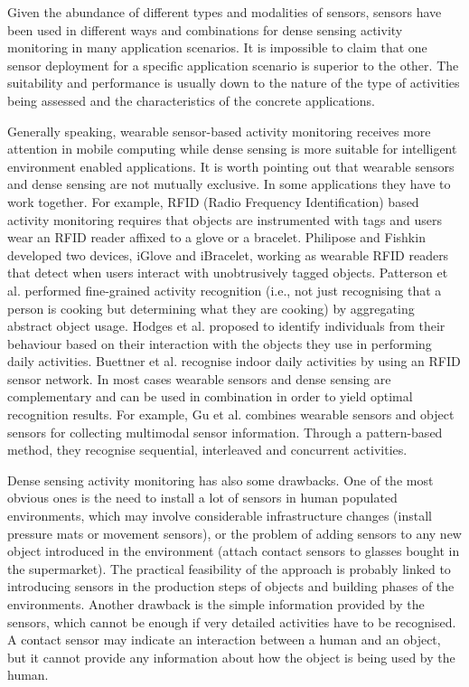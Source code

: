Given the abundance of different types and modalities of sensors, sensors have been used in different ways and combinations for dense sensing activity monitoring in many application scenarios. It is impossible to claim that one sensor deployment for a specific application scenario is superior to the other. The suitability and performance is usually down to the nature of the type of activities being assessed and the characteristics of the concrete applications. 

Generally speaking, wearable sensor-based activity monitoring receives more attention in mobile computing while dense sensing is more suitable for intelligent environment enabled applications. It is worth pointing out that wearable sensors and dense sensing are not mutually exclusive. In some applications they have to work together. For example, RFID (Radio Frequency Identification) based activity monitoring requires that objects are instrumented with tags and users wear an RFID reader affixed to a glove or a bracelet. Philipose and Fishkin \cite{Philipose2004} \cite{Fishkin2005} developed two devices, iGlove and iBracelet, working as wearable RFID readers that detect when users interact with unobtrusively tagged objects. Patterson et al. \cite{Patterson2005} performed fine-grained activity recognition (i.e., not just recognising that a person is cooking but determining what they are cooking) by aggregating abstract object usage. Hodges et al. \cite{Hodges2007} proposed to identify individuals from their behaviour based on their interaction with the objects they use in performing daily activities. Buettner et al. \cite{Buettner2009} recognise indoor daily activities by using an RFID sensor network. In most cases wearable sensors and dense sensing are complementary and can be used in combination in order to yield optimal recognition results. For example, Gu et al. \cite{Gu2009} combines wearable sensors and object sensors for collecting multimodal sensor information. Through a pattern-based method, they recognise sequential, interleaved and concurrent activities.

Dense sensing activity monitoring has also some drawbacks. One of the most obvious ones is the need to install a lot of sensors in human populated environments, which may involve considerable infrastructure changes (install pressure mats or movement sensors), or the problem of adding sensors to any new object introduced in the environment (attach contact sensors to glasses bought in the supermarket). The practical feasibility of the approach is probably linked to introducing sensors in the production steps of objects and building phases of the environments. Another drawback is the simple information provided by the sensors, which cannot be enough if very detailed activities have to be recognised. A contact sensor may indicate an interaction between a human and an object, but it cannot provide any information about how the object is being used by the human. 